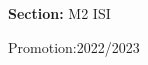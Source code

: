 \begin{flushleft}
    \textbf{Section:} M2 ISI
\end{flushleft}

\vspace*{4cm}

\begin{flushright}
    \large Promotion:2022/2023\\
\end{flushright}

\thispagestyle{empty}